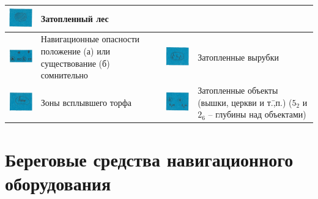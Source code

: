 \documentclass[a4paper, 12pt, twoside, final, book, russian, fittopage, cyremdash]{ncc}
\begin{document}
\begin{longtable}{M|m{0.2\textwidth}|M|m{0.2\textwidth}}
  \includegraphics[scale=1.3]{APP-2-A-32} & Затопленный лес \\
  \midrule
  \includegraphics[scale=1.3]{APP-2-A-25} & Навигационные опасности положение (а) или существование (б) сомнительно &
  \includegraphics[scale=1.3]{APP-2-A-33} & Затопленные вырубки \\
  \midrule
  \includegraphics[scale=1.3]{APP-2-A-34} & Зоны всплывшего торфа &
  \includegraphics[scale=1.3]{APP-2-A-35} & Затопленные объекты (вышки, церкви и т.\=,п.) ($5_2$ и $2_6$ \--- глубины над объектами) \\
  \bottomrule
\end{longtable}

\section{Береговые средства навигационного оборудования}\label{app:2b}
\end{document}

